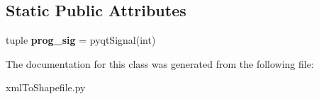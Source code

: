 \subsection*{Static Public Attributes}
\begin{DoxyCompactItemize}
\item 
\hypertarget{class_sim_g_d_c_1_1xml_to_shapefile_1_1_xml_to_shapefile_a4a1ee8f5c6f2294550f905aa88dbab3d}{}tuple {\bfseries prog\+\_\+sig} = pyqt\+Signal(int)\label{class_sim_g_d_c_1_1xml_to_shapefile_1_1_xml_to_shapefile_a4a1ee8f5c6f2294550f905aa88dbab3d}

\end{DoxyCompactItemize}


The documentation for this class was generated from the following file\+:\begin{DoxyCompactItemize}
\item 
xml\+To\+Shapefile.\+py\end{DoxyCompactItemize}

